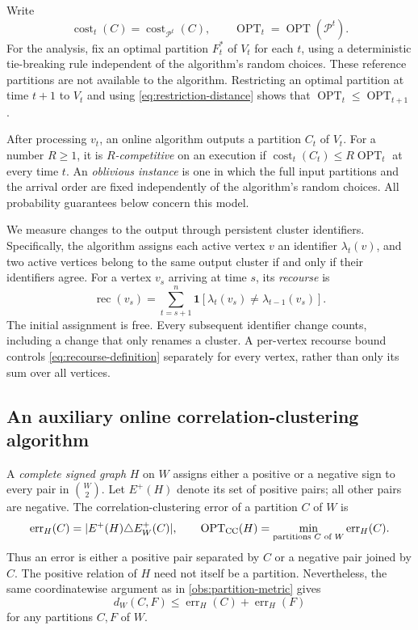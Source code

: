 \documentclass[11pt]{article}
\theoremstyle{definition}
\theoremstyle{remark}
\newcommand{\Pp}{\mathcal{P}}
\newcommand{\OPT}{\operatorname{OPT}}
\newcommand{\cost}{\operatorname{cost}}
\newcommand{\err}{\operatorname{err}}
\newcommand{\1}{\mathbf{1}}
\begin{document}
Write
\begin{equation}\label{eq:prefix-objective}
  \cost_t(C)=\cost_{\Pp^t}(C),
  \qquad
  \OPT_t=\OPT(\Pp^t).
\end{equation}
For the analysis, fix an optimal partition $F_t^*$ of $V_t$ for each $t$,
using a deterministic tie-breaking rule independent of the algorithm's
random choices. These reference partitions are not available to the
algorithm. Restricting an optimal partition at time $t+1$ to $V_t$
and using \eqref{eq:restriction-distance} shows that
$\OPT_t\le\OPT_{t+1}$.

After processing $v_t$, an online algorithm outputs a partition $C_t$ of
$V_t$. For a number $R\ge1$, it is \emph{$R$-competitive} on an execution
if $\cost_t(C_t)\le R\OPT_t$ at every time $t$.
An \emph{oblivious instance} is one in which the full input partitions
and the arrival order are fixed independently of the algorithm's random
choices. All probability guarantees below concern this model.

We measure changes to the output through persistent cluster identifiers.
Specifically, the algorithm assigns each active vertex $v$ an identifier
$\lambda_t(v)$, and two active vertices belong to the same output cluster
if and only if their identifiers agree.
For a vertex $v_s$ arriving at time $s$, its \emph{recourse} is
\begin{equation}\label{eq:recourse-definition}
  \operatorname{rec}(v_s)
  =\sum_{t=s+1}^n
    \1[\lambda_t(v_s)\ne\lambda_{t-1}(v_s)].
\end{equation}
The initial assignment is free. Every subsequent identifier change
counts, including a change that only renames a cluster.
A per-vertex recourse bound controls \eqref{eq:recourse-definition}
separately for every vertex, rather than only its sum over all vertices.

\subsection{An auxiliary online correlation-clustering algorithm}
\label{subsec:agreement}

A \emph{complete signed graph} $H$ on $W$ assigns either a positive or
a negative sign to every pair in $\binom{W}{2}$.
Let $E^+(H)$ denote its set of positive pairs; all other pairs are negative.
The correlation-clustering error of a partition $C$ of $W$ is
\begin{equation}\label{eq:cc-objective}
  \err_H(C)=|E^+(H)\triangle E_W^+(C)|,
  \qquad
  \OPT_{\rm CC}(H)
  =\min_{\text{partitions }C\text{ of }W}\err_H(C).
\end{equation}
Thus an error is either a positive pair separated by $C$ or a negative pair
joined by $C$. The positive relation of $H$ need not itself be a partition.
Nevertheless, the same coordinatewise argument as in
\cref{obs:partition-metric} gives
\begin{equation}\label{eq:signed-comparison}
  d_W(C,F)\le \err_H(C)+\err_H(F)
\end{equation}
for any partitions $C,F$ of $W$.
\end{document}

